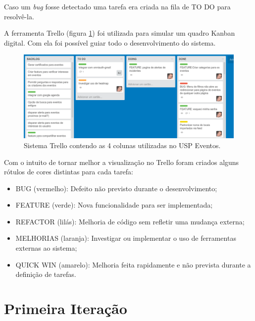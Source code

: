 \par Caso um \emph{bug} fosse detectado uma tarefa era criada na fila de TO DO para resolvê-la.
\par A ferramenta Trello (figura \ref{fig:kanban}) foi utilizada para simular um quadro Kanban digital. Com ela foi possível guiar todo o desenvolvimento do sistema.
\begin{figure}[htb]
\centering
\includegraphics[width=15cm]{figuras/kanban}
\caption{\label{fig:kanban} Sistema Trello contendo as 4 colunas utilizadas no USP Eventos.}
\end{figure}
        \par Com o intuito de tornar melhor a visualização no Trello foram criados alguns rótulos de cores distintas para cada tarefa:
        \begin{itemize}
        \item BUG (vermelho): Defeito não previsto durante o desenvolvimento;
        \item FEATURE (verde): Nova funcionalidade para ser implementada;
        \item REFACTOR (lilás):  Melhoria de código sem refletir uma mudança externa;
        \item MELHORIAS (laranja): Investigar ou implementar o uso de ferramentas externas ao sistema;
        \item QUICK WIN (amarelo): Melhoria feita rapidamente e não prevista durante a definição de tarefas.
        \end{itemize}
\section{Primeira Iteração}
